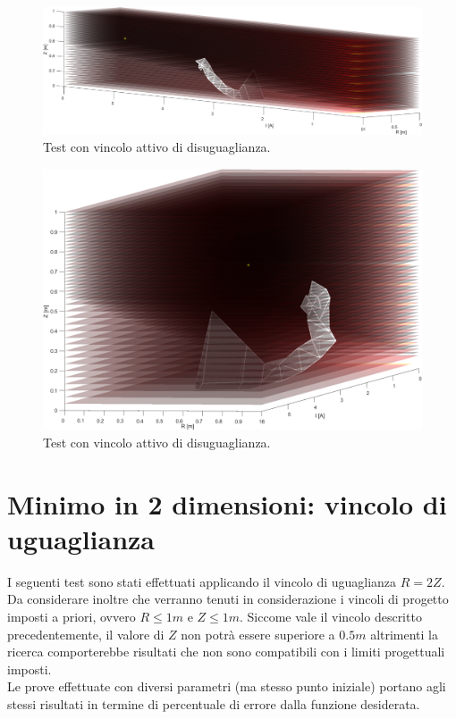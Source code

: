 \documentclass[a4paper, 11pt]{article}
\begin{document}
\begin{figure}[H]
    \centering
        \includegraphics[width=16cm]{assets/figure8}
        \caption{Test con vincolo attivo di disuguaglianza.}
\end{figure}
\noindent

\begin{figure}[H]
    \centering
        \includegraphics[width=13cm]{assets/figure9}
        \caption{Test con vincolo attivo di disuguaglianza.}
\end{figure}

\newpage
\section{Minimo in 2 dimensioni: vincolo di uguaglianza}

I seguenti test sono stati effettuati applicando il vincolo di uguaglianza $R =
2Z$. Da considerare inoltre che verranno tenuti in considerazione i vincoli di
progetto imposti a priori, ovvero $R \le 1m$ e $Z \le 1m$. Siccome vale il
vincolo descritto precedentemente, il valore di $Z$ non potrà essere superiore a
$0.5m$ altrimenti la ricerca comporterebbe risultati che non sono compatibili
con i limiti progettuali imposti. \\
Le prove effettuate con diversi parametri (ma stesso punto iniziale) portano
agli stessi risultati in termine di percentuale di errore dalla funzione
desiderata.
\end{document}
